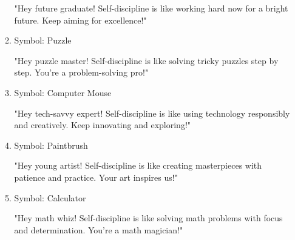 \documentclass[14pt, letterpaper, twoside]{article}
\begin{document}
\begin{itemize}
\begin{enumerate}
		"Hey future graduate! Self-discipline is like working hard now for a bright 
		future. Keep aiming for excellence!"
		\item Symbol: Puzzle 
		
		"Hey puzzle master! Self-discipline is like solving tricky puzzles step by step.
		You're a problem-solving pro!"
		\item Symbol: Computer Mouse 
		
		"Hey tech-savvy expert! Self-discipline is like using technology responsibly and
		creatively. Keep innovating and exploring!"
		\item Symbol: Paintbrush 
		
		"Hey young artist! Self-discipline is like creating masterpieces with patience and
		practice. Your art inspires us!"
		\item Symbol: Calculator 
		
		"Hey math whiz! Self-discipline is like solving math problems with focus and
		determination. You're a math magician!"
		\end{enumerate}
	\end{itemize}
		 
\end{document}
